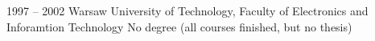\documentclass[8pt]{developercv} %
\begin{document}


\begin{entrylist}
	\entry
	    {1997 -- 2002}
            {Warsaw University of Technology, Faculty of Electronics
              and Inforamtion Technology}
            {}
	    {No degree (all courses finished, but no thesis)}
\end{entrylist}
\end{document}
